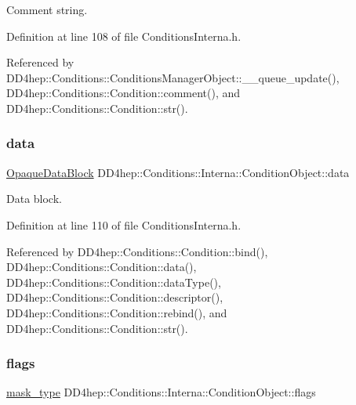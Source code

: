 Comment string. 



Definition at line 108 of file Conditions\+Interna.\+h.



Referenced by D\+D4hep\+::\+Conditions\+::\+Conditions\+Manager\+Object\+::\+\_\+\+\_\+queue\+\_\+update(), D\+D4hep\+::\+Conditions\+::\+Condition\+::comment(), and D\+D4hep\+::\+Conditions\+::\+Condition\+::str().

\hypertarget{class_d_d4hep_1_1_conditions_1_1_interna_1_1_condition_object_a049350e2cf3f94aa39a04edd0a18a018}{}\label{class_d_d4hep_1_1_conditions_1_1_interna_1_1_condition_object_a049350e2cf3f94aa39a04edd0a18a018} 
\subsubsection{\texorpdfstring{data}{data}}
{\footnotesize\ttfamily \hyperlink{class_d_d4hep_1_1_opaque_data_block}{Opaque\+Data\+Block} D\+D4hep\+::\+Conditions\+::\+Interna\+::\+Condition\+Object\+::data}



Data block. 



Definition at line 110 of file Conditions\+Interna.\+h.



Referenced by D\+D4hep\+::\+Conditions\+::\+Condition\+::bind(), D\+D4hep\+::\+Conditions\+::\+Condition\+::data(), D\+D4hep\+::\+Conditions\+::\+Condition\+::data\+Type(), D\+D4hep\+::\+Conditions\+::\+Condition\+::descriptor(), D\+D4hep\+::\+Conditions\+::\+Condition\+::rebind(), and D\+D4hep\+::\+Conditions\+::\+Condition\+::str().

\hypertarget{class_d_d4hep_1_1_conditions_1_1_interna_1_1_condition_object_ad6e3e4fed5b13ddc85577d1fe5f3fcfd}{}\label{class_d_d4hep_1_1_conditions_1_1_interna_1_1_condition_object_ad6e3e4fed5b13ddc85577d1fe5f3fcfd} 
\subsubsection{\texorpdfstring{flags}{flags}}
{\footnotesize\ttfamily \hyperlink{class_d_d4hep_1_1_conditions_1_1_interna_1_1_condition_object_a1a9ff63fe2e060b973e6c2994b0a1370}{mask\+\_\+type} D\+D4hep\+::\+Conditions\+::\+Interna\+::\+Condition\+Object\+::flags}



